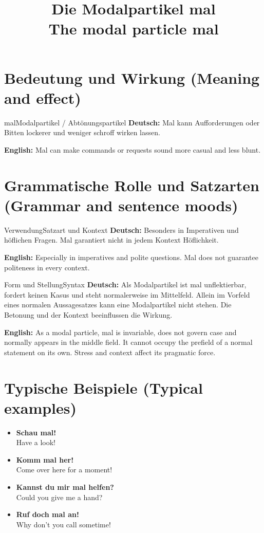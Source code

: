 \documentclass[a4paper,11pt]{article}
\title{Die Modalpartikel \glqq mal\grqq\\{\large\textnormal{The modal particle mal}}}
\date{}
\newcommand{\GermanText}[1]{\textbf{Deutsch: }#1\par}
\newcommand{\EnglishText}[1]{{\small\color{SoftGray}\textbf{English: }#1\par}}
\newcommand{\ExampleItem}[2]{\item \textbf{#1}\\{\small\color{SoftGray}#2}}
\begin{document}
\maketitle
\tableofcontents
\section{Bedeutung und Wirkung \textnormal{(Meaning and effect)}}
\begin{grammarentry}{mal}{Modalpartikel / Abtönungspartikel}
\GermanText{Mal kann Aufforderungen oder Bitten lockerer und weniger schroff wirken lassen.}
\EnglishText{Mal can make commands or requests sound more casual and less blunt.}
\end{grammarentry}
\section{Grammatische Rolle und Satzarten \textnormal{(Grammar and sentence moods)}}
\begin{grammarentry}{Verwendung}{Satzart und Kontext}
\GermanText{Besonders in Imperativen und höflichen Fragen. Mal garantiert nicht in jedem Kontext Höflichkeit.}
\EnglishText{Especially in imperatives and polite questions. Mal does not guarantee politeness in every context.}
\end{grammarentry}
\begin{grammarentry}{Form und Stellung}{Syntax}
\GermanText{Als Modalpartikel ist mal unflektierbar, fordert keinen Kasus und steht normalerweise im Mittelfeld. Allein im Vorfeld eines normalen Aussagesatzes kann eine Modalpartikel nicht stehen. Die Betonung und der Kontext beeinflussen die Wirkung.}
\EnglishText{As a modal particle, mal is invariable, does not govern case and normally appears in the middle field. It cannot occupy the prefield of a normal statement on its own. Stress and context affect its pragmatic force.}
\end{grammarentry}
\section{Typische Beispiele \textnormal{(Typical examples)}}
\begin{exbox}\begin{itemize}
\ExampleItem{Schau mal!}{Have a look!}
\ExampleItem{Komm mal her!}{Come over here for a moment!}
\ExampleItem{Kannst du mir mal helfen?}{Could you give me a hand?}
\ExampleItem{Ruf doch mal an!}{Why don't you call sometime!}
\end{itemize}\end{exbox}
\end{document}
